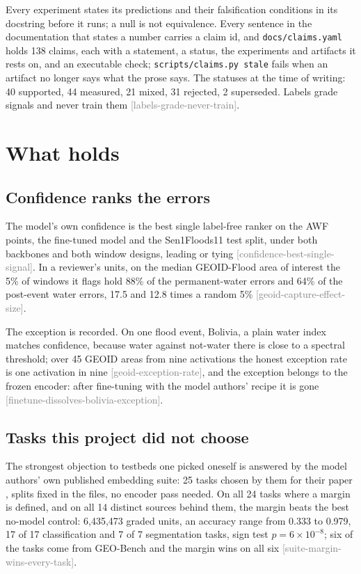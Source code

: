 \documentclass[11pt,a4paper]{article}
\newcommand{\claim}[1]{{\scriptsize\textsf{\textcolor{gray}{[#1]}}}}
\begin{document}
Every experiment states its predictions and their falsification conditions in
its docstring before it runs; a null is not equivalence. Every sentence in the
documentation that states a number carries a claim id, and \texttt{docs/claims.yaml}
holds 138 claims, each with a statement, a status, the experiments and artifacts
it rests on, and an executable check; \texttt{scripts/claims.py stale} fails when
an artifact no longer says what the prose says. The statuses at the time of
writing: 40 supported, 44 measured, 21 mixed, 31 rejected, 2 superseded. Labels
grade signals and never train them \claim{labels-grade-never-train}.

\section{What holds}

\subsection{Confidence ranks the errors}

The model's own confidence is the best single label-free ranker on the AWF
points, the fine-tuned model and the Sen1Floods11 test split, under both
backbones and both window designs, leading or tying \claim{confidence-best-single-signal}.
In a reviewer's units, on the median GEOID-Flood area of interest the 5\% of
windows it flags hold 88\% of the permanent-water errors and 64\% of the
post-event water errors, 17.5 and 12.8 times a random 5\% \claim{geoid-capture-effect-size}.

The exception is recorded. On one flood event, Bolivia, a plain water index
matches confidence, because water against not-water there is close to a spectral
threshold; over 45 GEOID areas from nine activations the honest exception rate is
one activation in nine \claim{geoid-exception-rate}, and the exception belongs to
the frozen encoder: after fine-tuning with the model authors' recipe it is gone
\claim{finetune-dissolves-bolivia-exception}.

\subsection{Tasks this project did not choose}

The strongest objection to testbeds one picked oneself is answered by the model
authors' own published embedding suite: 25 tasks chosen by them for their paper
\citep{herzog2025}, splits fixed in the files, no encoder pass needed. On all 24
tasks where a margin is defined, and on all 14 distinct sources behind them, the
margin beats the best no-model control: 6,435,473 graded units, an accuracy range
from 0.333 to 0.979, 17 of 17 classification and 7 of 7 segmentation tasks,
sign test $p = 6\times10^{-8}$; six of the tasks come from GEO-Bench
\citep{lacoste2023} and the margin wins on all six \claim{suite-margin-wins-every-task}.
\end{document}

